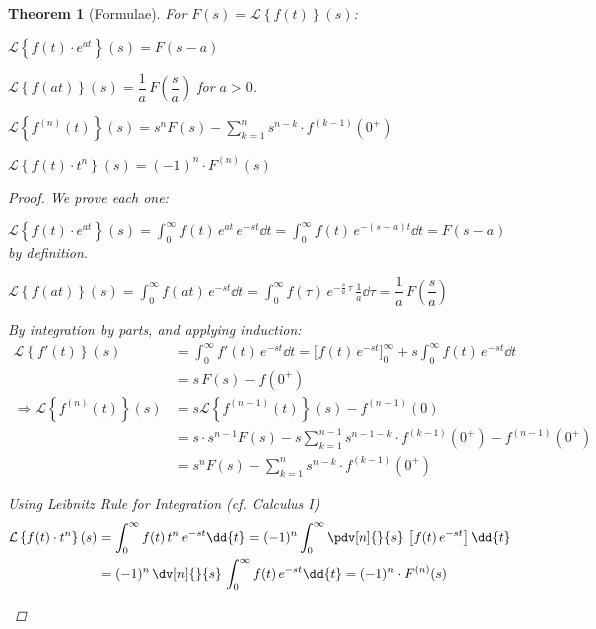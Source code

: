 \documentclass[12pt]{article}
\newcommand{\der}[2][n]{{#2}^{(#1)}}
\newcommand{\Lapl}[2][s]{\mathcal{L}\left\{#2\right\}(#1)}
\newtheorem{theorem}{Theorem}[subsection]
\begin{document}
\begin{theorem}[Formulae]
  For $F(s)=\Lapl{f(t)}$:
  \begin{compactenum}[(i)]
    \item $\Lapl{f(t)\cdot e^{at}}=F(s-a)$
    \item $\Lapl{f(at)}=\dfrac{1}{a}\,F\left(\dfrac{s}{a}\right)$ for $a>0$.
    \item $\Lapl{\der{f}(t)}=s^n F(s)-\displaystyle\sum_{k=1}^n s^{n-k}\cdot\der[k-1]{f}(0^+)$
    \item $\Lapl{f(t)\cdot t^n}=(-1)^n\cdot \der{F}(s)$
  \end{compactenum}
  \begin{proof}
    We prove each one:
    \begin{compactenum}[(i)]
      \item $\displaystyle\Lapl{f(t)\cdot e^{at}}=\int_0^\infty f(t)\,e^{at}\,e^{-st}\dd{t}=\int_0^\infty f(t)\,e^{-(s-a)t}\dd{t}=F(s-a)$ by definition.
      \item $\displaystyle\Lapl{f(at)}=\int_0^\infty f(at)\,e^{-st}\dd{t}=\int_0^\infty f(\tau)\,e^{-\frac{s}{a}\,\tau}\,\frac{1}{a}\dd{\tau}=\dfrac{1}{a}\,F\left(\dfrac{s}{a}\right)$
      \item By integration by parts, and applying induction:
      \begin{align*}
        \Lapl{f'(t)}&=\int_0^\infty f'(t)\,e^{-st}\dd{t}=\Big[f(t)\,e^{-st}\Big]_0^\infty+s\int_0^\infty f(t)\,e^{-st}\dd{t}\\
        &=s\,F(s)-f(0^+)\\
        \Rightarrow \Lapl{\der{f}(t)}&=s\Lapl{\der[n-1]{f}(t)}-\der[n-1]{f}(0)\\
        &=s\cdot s^{n-1} F(s)-s\sum_{k=1}^{n-1} s^{n-1-k}\cdot\der[k-1]{f}(0^+)-\der[n-1]{f}(0^+)\\
        &=s^n F(s)-\sum_{k=1}^n s^{n-k}\cdot\der[k-1]{f}(0^+)
      \end{align*}
      \item Using Leibnitz Rule for Integration (cf. Calculus I)
      \begin{align*}
        \Lapl{f(t)\cdot t^n}&=\int_0^\infty f(t)\,t^n\,e^{-st}\dd{t}=(-1)^n\int_0^\infty \pdv[n]{}{s}\,\left[f(t)\,e^{-st}\right]\dd{t}\\
        &=(-1)^n\,\dv[n]{}{s}\,\int_0^\infty f(t)\,e^{-st}\dd{t}=(-1)^n\cdot \der{F}(s)
      \end{align*}
    \end{compactenum}
  \end{proof}
\end{theorem}
\end{document}
